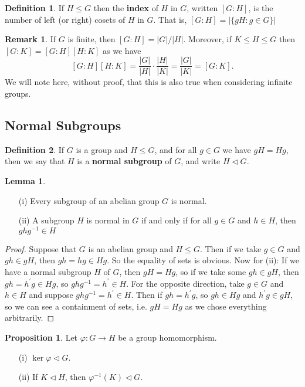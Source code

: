 \documentclass[9pt,reqno]{amsart}
\theoremstyle{definition}
\newtheorem{defi}{Definition}[section]
\newtheorem{lemma}{Lemma}[section]
\newtheorem{rem}{Remark}[section]
\newtheorem{prop}{Proposition}[section]
\newcommand{\pp}{\prime}
\begin{document}
\begin{defi}
If $H \leq G$ then the \textbf{index} of $H$ in $G$, written $[G \colon H]$, is the number of left (or right) cosets of $H$ in $G$. That is, $[G \colon H] = | \{gH \colon g \in G \} |$	
\end{defi}
\begin{rem}
If $G$ is finite, then $[G \colon H ] = |G| / |H|$.	Moreover, if $K \leq H \leq G$ then $[G \colon K ] = [G \colon H ] [H \colon K]$ as we have $$[G \colon H ] [H \colon K] = \frac{|G|}{|H|} \cdot \frac{|H|}{|K|} = \frac{|G|}{|K|} = [G \colon K]. $$ We will note here, without proof, that this is also true when considering infinite groups. 
\end{rem}




\subsection{Normal Subgroups}
\begin{defi}
If $G$ is a group and $H \leq G$, and for all $g \in G$ we have $gH = Hg$, then we say that $H$ is a \textbf{normal subgroup} of $G$, and write $H \lhd G$. 	
\end{defi}
\begin{lemma}
	\begin{itemize}
		\item[(i)] Every subgroup of an abelian group $G$ is normal.
		\item[(ii)] A subgroup $H$ is normal in $G$ if and only if for all $g \in G$ and $h \in H$, then $ghg^{-1} \in H$
	\end{itemize}
\end{lemma}
\begin{proof}
	Suppose that $G$ is an abelian group and $H \leq G$. Then if we take $g \in G$ and $gh \in gH$, then $gh = hg \in Hg$. So the equality of sets is obvious. Now for (ii): If we have a normal subgroup $H$ of $G$, then $gH = Hg$, so if we take some $gh \in gH$, then $gh = h^\pp g \in Hg$, so $ghg^{-1} = h^\pp \in H$. For the opposite direction, take $g \in G$ and $h \in H$ and suppose $ghg^{-1} = h^\pp \in H$. Then if $gh = h^\pp g$, so $gh \in Hg$ and $h^\pp g \in gH$, so we can see a containment of sets, i.e. $gH = Hg$ as we chose everything arbitrarily. 
	\end{proof}
	\begin{prop}
		Let $\varphi \colon G \to H$ be a group homomorphism.
		\begin{itemize}
			\item [(i)] $\ker \varphi \lhd G$. 
			\item [(ii)] If $K \lhd H$, then $\varphi^{-1} (K) \lhd G$. 
		\end{itemize}
	\end{prop}
\end{document}
